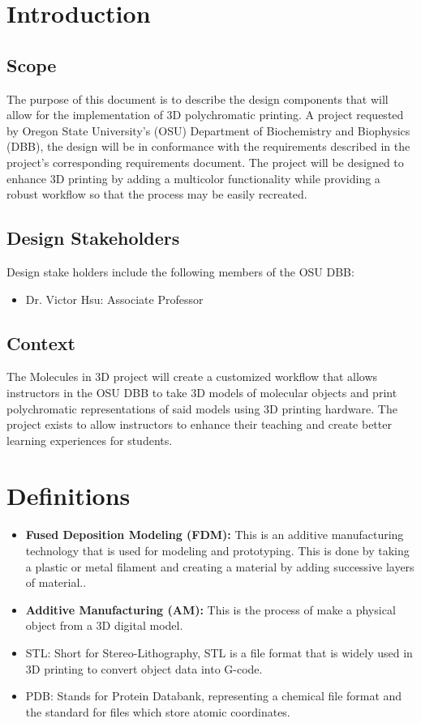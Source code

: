\documentclass[letterpaper, onecolumn, draftclsnofoot, 10pt, compsoc]{IEEEtran}
\begin{document}
\begin{singlespace}
\section{Introduction}
	\subsection{Scope}
    	The purpose of this document is to describe the design components that will allow for the implementation of 3D polychromatic printing. 
        A project requested by Oregon State University's (OSU) Department of Biochemistry and Biophysics (DBB), the design will be in conformance with the requirements described in the project's corresponding requirements document. 
        The project will be designed to enhance 3D printing by adding a multicolor functionality while providing a robust workflow so that the process may be easily recreated. 
    \subsection{Design Stakeholders}
    	Design stake holders include the following members of the OSU DBB:
    	\begin{itemize}
    	\item Dr. Victor Hsu: Associate Professor
    	\end{itemize}
    \subsection{Context}
    	The Molecules in 3D project will create a customized workflow that allows instructors in the OSU DBB to take 3D models of molecular objects and print polychromatic representations of said models using 3D printing hardware.
        The project exists to allow instructors to enhance their teaching and create better learning experiences for students. 
       
\section{Definitions} %
	\begin{itemize}
		\item\textbf{Fused Deposition Modeling (FDM):} This is an additive manufacturing technology that is used for modeling and prototyping. This is done by taking a plastic or metal filament and creating a material by adding successive layers of material.\cite{fusedep}.
        \item\textbf{Additive Manufacturing (AM):} This is the process of make a physical object from a 3D digital model.\cite{additiveman}
       \item STL: Short for Stereo-Lithography, STL is a file format that is widely used in 3D printing to convert object data into G-code.
      \item PDB: Stands for Protein Databank, representing a chemical file format and the standard for files which store atomic coordinates.
	\end{itemize}

\end{singlespace}
\end{document}
